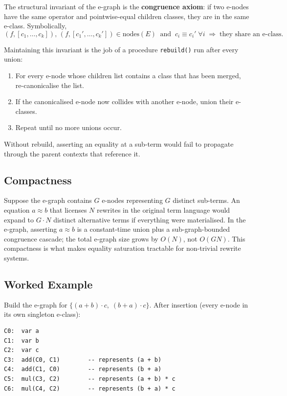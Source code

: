 \documentclass[11pt,a4paper]{article}
\begin{document}
The structural invariant of the e-graph is the \textbf{congruence axiom}: if two e-nodes have the same operator and pointwise-equal children classes, they are in the same e-class. Symbolically,
\[
  (f, [c_1, \ldots, c_k]),\,(f, [c_1', \ldots, c_k']) \in \mathrm{nodes}(E)
  \;\;\text{and}\;\;
  c_i \equiv c_i' \;\forall i
  \;\Longrightarrow\;
  \text{they share an e-class}.
\]

Maintaining this invariant is the job of a procedure \texttt{rebuild()} run after every union:
\begin{enumerate}
\item For every e-node whose children list contains a class that has been merged, re-canonicalise the list.
\item If the canonicalised e-node now collides with another e-node, union their e-classes.
\item Repeat until no more unions occur.
\end{enumerate}
Without rebuild, asserting an equality at a sub-term would fail to propagate through the parent contexts that reference it.

\subsection{Compactness}\label{sec:compactness}

Suppose the e-graph contains $G$ e-nodes representing $G$ distinct sub-terms. An equation $a \approx b$ that licenses $N$ rewrites in the original term language would expand to $G \cdot N$ distinct alternative terms if everything were materialised. In the e-graph, asserting $a \approx b$ is a constant-time union plus a sub-graph-bounded congruence cascade; the total e-graph size grows by $O(N)$, not $O(GN)$. This compactness is what makes equality saturation tractable for non-trivial rewrite systems.

\subsection{Worked Example}\label{sec:egraph-worked}

Build the e-graph for $\{(a + b) \cdot c,\; (b + a) \cdot c\}$. After insertion (every e-node in its own singleton e-class):

\begin{lstlisting}
C0:  var a
C1:  var b
C2:  var c
C3:  add(C0, C1)        -- represents (a + b)
C4:  add(C1, C0)        -- represents (b + a)
C5:  mul(C3, C2)        -- represents (a + b) * c
C6:  mul(C4, C2)        -- represents (b + a) * c
\end{lstlisting}
\end{document}
